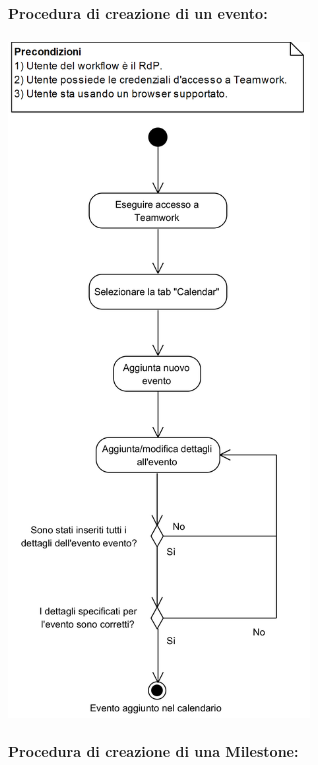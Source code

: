 \paragraph{Procedura di creazione di un evento:}

\begin{center}
	\includegraphics[width=8cm]{./DiagrammiProcedure/CreazioneEventoNelCalendario.png}
\end{center}

\paragraph{Procedura di creazione di una Milestone:}

